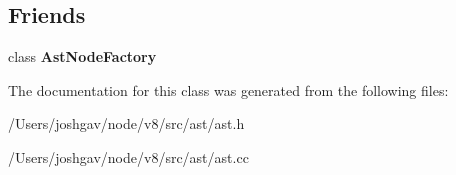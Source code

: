 \subsection*{Friends}
\begin{DoxyCompactItemize}
\item 
class {\bfseries Ast\+Node\+Factory}\hypertarget{classv8_1_1internal_1_1_object_literal_property_a8d587c8ad3515ff6433eb83c578e795f}{}\label{classv8_1_1internal_1_1_object_literal_property_a8d587c8ad3515ff6433eb83c578e795f}

\end{DoxyCompactItemize}


The documentation for this class was generated from the following files\+:\begin{DoxyCompactItemize}
\item 
/\+Users/joshgav/node/v8/src/ast/ast.\+h\item 
/\+Users/joshgav/node/v8/src/ast/ast.\+cc\end{DoxyCompactItemize}
